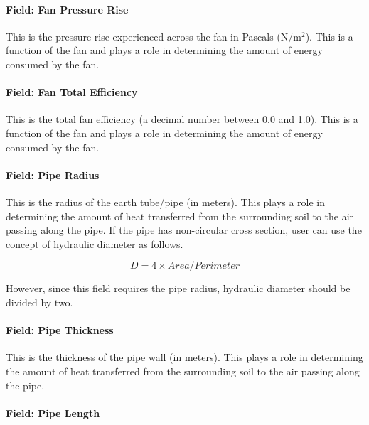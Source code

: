 \paragraph{Field: Fan Pressure Rise}\label{field-fan-pressure-rise-1}

This is the pressure rise experienced across the fan in Pascals (N/m\(^{2}\)). This is a function of the fan and plays a role in determining the amount of energy consumed by the fan.

\paragraph{Field: Fan Total Efficiency}\label{field-fan-total-efficiency-1}

This is the total fan efficiency (a decimal number between 0.0 and 1.0). This is a function of the fan and plays a role in determining the amount of energy consumed by the fan.

\paragraph{Field: Pipe Radius}\label{field-pipe-radius}

This is the radius of the earth tube/pipe (in meters). This plays a role in determining the amount of heat transferred from the surrounding soil to the air passing along the pipe. If the pipe has non-circular cross section, user can use the concept of hydraulic diameter as follows.

\begin{equation}
D = 4 \times Area/Perimeter
\end{equation}

However, since this field requires the pipe radius, hydraulic diameter should be divided by two.

\paragraph{Field: Pipe Thickness}\label{field-pipe-thickness}

This is the thickness of the pipe wall (in meters). This plays a role in determining the amount of heat transferred from the surrounding soil to the air passing along the pipe.

\paragraph{Field: Pipe Length}\label{field-pipe-length}

